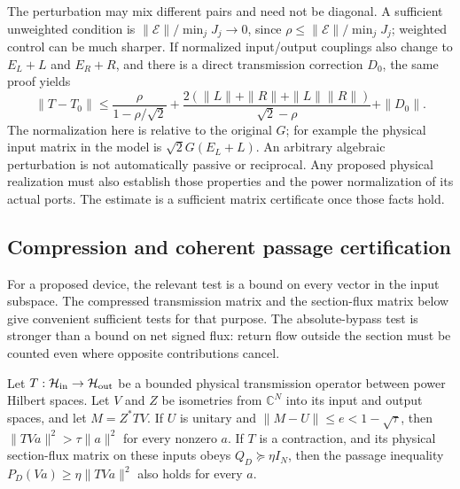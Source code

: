 \begin{remark}
\label{cx:port-errors}
The perturbation may mix different pairs and need not be diagonal.
A sufficient unweighted condition is
$\|\mathcal E\|/\min_jJ_j\to0$, since
$\rho\leq\|\mathcal E\|/\min_jJ_j$; weighted control can be much sharper.
If normalized input/output couplings also change to $E_L+L$ and $E_R+R$,
and there is a direct transmission correction $D_0$, the same proof yields
\begin{equation}
 \|T-T_0\|\leq
 \frac{\rho}{1-\rho/\sqrt2}
 +\frac{2(\|L\|+\|R\|+\|L\|\|R\|)}{\sqrt2-\rho}
 +\|D_0\|.
 \label{cx:all-errors}
\end{equation}
The normalization here is relative to the original $G$; for example the
physical input matrix in the model is $\sqrt2G(E_L+L)$.
An arbitrary algebraic perturbation is not automatically passive or
reciprocal. Any proposed physical realization must also establish those
properties and the power normalization of its actual ports. The estimate
is a sufficient matrix certificate once those facts hold.
\end{remark}

\subsection{Compression and coherent passage certification}

For a proposed device, the relevant test is a bound on every vector in the
input subspace.  The compressed transmission matrix and the section-flux
matrix below give convenient sufficient tests for that purpose.  The
absolute-bypass test is stronger than a bound on net signed flux: return flow
outside the section must be counted even where opposite contributions cancel.

\begin{proposition}
\label{cx:compression}
Let $T:\mathcal H_{\rm in}\to\mathcal H_{\rm out}$ be a bounded physical
transmission operator between power Hilbert spaces. Let $V$ and $Z$ be
isometries from $\mathbb C^N$ into its input and output spaces, and let
$M=Z^*TV$. If $U$ is unitary and
$\|M-U\|\leq e<1-\sqrt\tau$, then
$\|TVa\|^2>\tau\|a\|^2$ for every nonzero $a$.
If $T$ is a contraction, and its physical section-flux matrix on these
inputs obeys $Q_D\succeq\eta I_N$, then the passage inequality
$P_D(Va)\geq\eta\|TVa\|^2$ also holds for every $a$.
\end{proposition}

